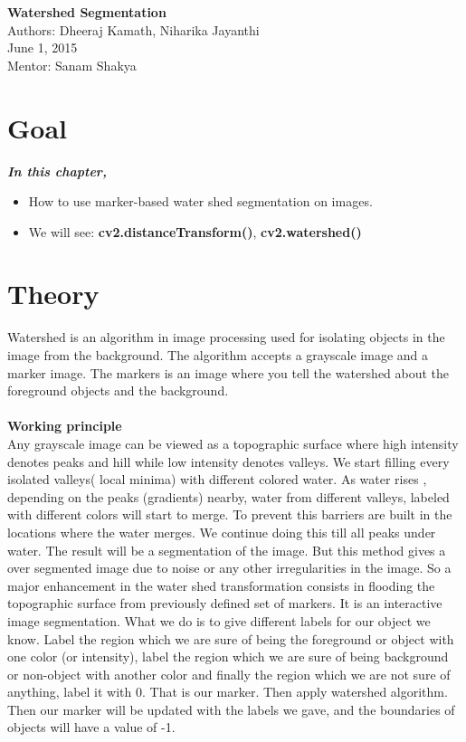 \documentclass[]{article}
\date{}
\begin{document}
	
\begin{titlepage}
	\centering	
	\huge \textbf{Watershed Segmentation} \\
	\large
	Authors: Dheeraj Kamath, Niharika Jayanthi \\
	June 1, 2015 \\
	Mentor: Sanam Shakya \\
			
\end{titlepage}

\section{Goal}\label{goal}

\emph{\textbf{In this chapter,}} 
\begin{itemize} 
	\item How to use marker-based water shed segmentation on images.
    \item  We will see: \textbf{cv2.distanceTransform()}, \textbf{cv2.watershed()}
\end{itemize}

\section{Theory}\label{theory}
Watershed is an algorithm in image processing used for isolating objects in the image from the background. The algorithm accepts a grayscale image and a marker image. The markers is an image where you tell the watershed about the foreground objects and the background. \\
\\
\Large{\textbf{Working principle}} \\
Any grayscale image can be viewed as a topographic surface where high intensity denotes peaks and hill while low intensity denotes valleys. We start filling every isolated valleys( local minima) with different colored water. As water rises , depending on the peaks (gradients) nearby, water from different valleys, labeled with different colors will start to merge. To prevent this barriers are built in the locations where the water merges. We continue doing this till all peaks under water. The result will be a segmentation of the image. But this method gives a over segmented image due to noise or any other irregularities in the image. So a major enhancement in the water shed transformation consists in flooding the topographic surface from previously defined set of markers. It is an interactive image segmentation.
What we do is to give different labels for our object we know. Label the region which we are sure of being the foreground or object with one color (or intensity), label the region which we are sure of being background or non-object with another color and finally the region which we are not sure of anything, label it with 0. That is our marker. Then apply watershed algorithm. Then our marker will be updated with the labels we gave, and the boundaries of objects will have a value of -1.
\end{document}
